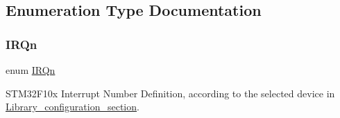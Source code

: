 \subsection{Enumeration Type Documentation}
\mbox{\label{group___configuration__section__for___c_m_s_i_s_ga666eb0caeb12ec0e281415592ae89083}} 
\subsubsection{\texorpdfstring{IRQn}{IRQn}}
{\footnotesize\ttfamily enum \mbox{\hyperlink{group___configuration__section__for___c_m_s_i_s_ga666eb0caeb12ec0e281415592ae89083}{I\+R\+Qn}}}



S\+T\+M32\+F10x Interrupt Number Definition, according to the selected device in \mbox{\hyperlink{group___library__configuration__section}{Library\+\_\+configuration\+\_\+section}}. 

